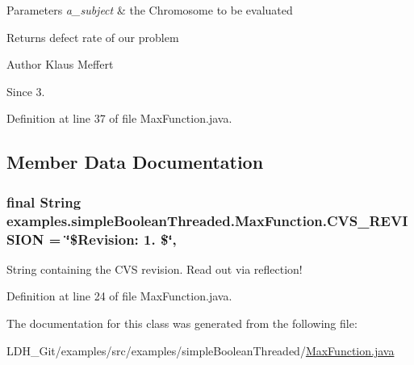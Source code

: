 \begin{DoxyParams}{Parameters}
{\em a\-\_\-subject} & the Chromosome to be evaluated \\
\hline
\end{DoxyParams}
\begin{DoxyReturn}{Returns}
defect rate of our problem
\end{DoxyReturn}
\begin{DoxyAuthor}{Author}
Klaus Meffert 
\end{DoxyAuthor}
\begin{DoxySince}{Since}
3. 
\end{DoxySince}


Definition at line 37 of file Max\-Function.\-java.



\subsection{Member Data Documentation}
\hypertarget{classexamples_1_1simple_boolean_threaded_1_1_max_function_ab99fd6cf3c6a3dbc3ffa854d10f59f10}{
\subsubsection[{C\-V\-S\-\_\-\-R\-E\-V\-I\-S\-I\-O\-N}]{\setlength{\rightskip}{0pt plus 5cm}final String examples.\-simple\-Boolean\-Threaded.\-Max\-Function.\-C\-V\-S\-\_\-\-R\-E\-V\-I\-S\-I\-O\-N = \char`\"{}\$Revision\-: 1. \$\char`\"{}\hspace{0.3cm}{\ttfamily [static]}, {\ttfamily [private]}}}\label{classexamples_1_1simple_boolean_threaded_1_1_max_function_ab99fd6cf3c6a3dbc3ffa854d10f59f10}
String containing the C\-V\-S revision. Read out via reflection! 

Definition at line 24 of file Max\-Function.\-java.



The documentation for this class was generated from the following file\-:\begin{DoxyCompactItemize}
\item 
L\-D\-H\-\_\-\-Git/examples/src/examples/simple\-Boolean\-Threaded/\hyperlink{examples_2src_2examples_2simple_boolean_threaded_2_max_function_8java}{Max\-Function.\-java}\end{DoxyCompactItemize}
